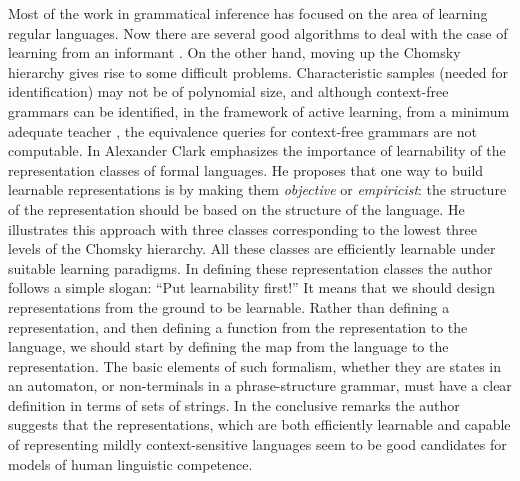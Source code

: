 Most of the work in grammatical inference has focused on the area of learning regular languages. Now there are several good algorithms to deal with the case of learning from an informant \citep{Cicchello2003}. On the other hand, moving up the Chomsky hierarchy gives rise to some difficult problems. Characteristic samples (needed for identification) may not be of polynomial size, and although context-free grammars can be identified, in the framework of active learning, from a minimum adequate teacher \citep{Angluin1987}, the equivalence queries for context-free grammars are not computable. In \citep{Clark2010} Alexander Clark emphasizes the importance of learnability of the representation classes of formal languages. He proposes that one way to build learnable representations is by making them \emph{objective} or \emph{empiricist}: the structure of the representation should be based on the structure of the language. He illustrates this approach with three classes corresponding to the lowest three levels of the Chomsky hierarchy. All these classes are efficiently learnable under suitable learning paradigms. In defining these representation classes the author follows a simple slogan: ``Put learnability first!'' It means that we should design representations from the ground to be learnable. Rather than defining a representation, and then defining a function from the representation to the language, we should start by defining the map from the language to the representation. The basic elements of such formalism, whether they are states in an automaton, or non-terminals in a phrase-structure grammar, must have a clear definition in terms of sets of strings. In the conclusive remarks the author suggests that the  representations, which are both efficiently learnable and capable of representing mildly context-sensitive languages seem to be good candidates for models of human linguistic competence.

